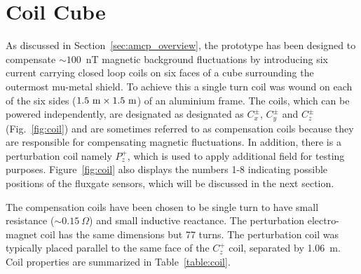 
\section{Coil Cube}\label{sec:cube}



As discussed in Section~\ref{sec:amcp_overview}, the prototype has been designed to compensate $\sim 100$~nT magnetic background fluctuations by introducing six current carrying closed loop coils on six faces of a cube surrounding the outermost mu-metal shield. To achieve this a single turn coil was wound on each of the six sides ($\rm 1.5~m\times1.5~m$) of an aluminium frame. The coils, which can be powered independently,
are designated as designated as $C_x^\pm$, $C_y^\pm$ and $C_z^\pm$ (Fig.~\ref{fig:coil}) and are sometimes referred to as compensation coils because they are responsible for compensating magnetic fluctuations. In addition, there is a perturbation coil namely $P_z^+$, which is used to apply additional field for testing purposes. Figure~\ref{fig:coil} also displays the numbers 1-8 indicating possible positions of the fluxgate sensors, which will be discussed in the next section.


The compensation coils have been chosen to be single turn to have small resistance ($\sim0.15~\Omega$) and small inductive reactance. The perturbation electro-magnet coil has the same dimensions but 77 turns. The perturbation coil was typically placed parallel to the same face of the $C_z^+$ coil, separated by 1.06~m. Coil properties are summarized in Table~\ref{table:coil}. 

